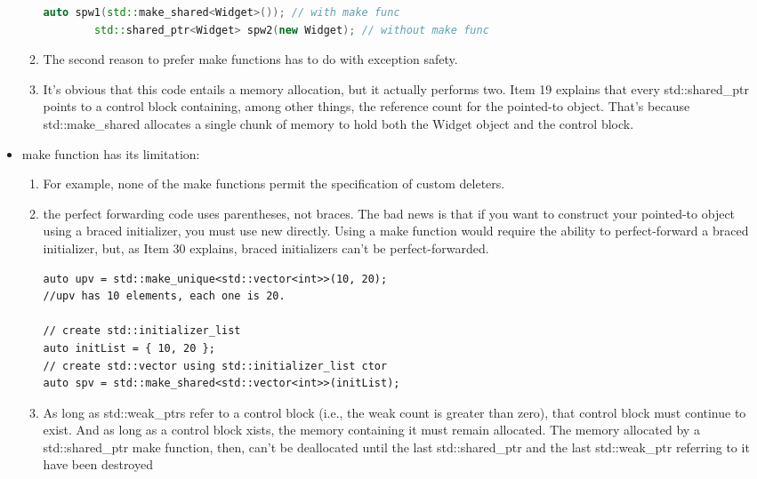 \documentclass[a4paper,12pt,twoside]{book}
\begin{document}
\begin{itemize}
\begin{enumerate}
\begin{lstlisting}[frame=single, language=c++, mathescape=true]
		auto spw1(std::make_shared<Widget>()); // with make func
		std::shared_ptr<Widget> spw2(new Widget); // without make func
		\end{lstlisting}
		
		\item The second reason to prefer make functions has to do with exception safety.

		\item It's obvious that this code entails a memory allocation, but it actually performs two. Item 19 explains that every std::shared\_ptr points to a control block containing, among other things, the reference count for the pointed-to object. That's because std::make\_shared allocates a single chunk of memory to hold both the Widget object and the control block.
		
	\end{enumerate}
	
	\item make function has its limitation:
	\begin{enumerate}
		\item For example, none of the make functions permit the specification of custom deleters.
		
		\item the perfect forwarding code uses parentheses, not braces. The bad news is that if you want to construct your pointed-to object using a braced initializer, you must use new directly. Using a make function would require the ability to perfect-forward a braced initializer, but, as Item 30 explains, braced initializers can't be perfect-forwarded.
\begin{lstlisting}
auto upv = std::make_unique<std::vector<int>>(10, 20);
//upv has 10 elements, each one is 20.

// create std::initializer_list
auto initList = { 10, 20 };
// create std::vector using std::initializer_list ctor
auto spv = std::make_shared<std::vector<int>>(initList);
\end{lstlisting}
		
		\item As long as std::weak\_ptrs refer to a control block (i.e., the weak count is greater than zero), that control block must continue to exist. And as long as a control block xists, the memory containing it must remain allocated. The memory allocated by a std::shared\_ptr make function, then, can't be deallocated until the last std::shared\_ptr and the last std::weak\_ptr referring to it have been destroyed
	\end{enumerate}
	

\end{itemize}
\end{document}
